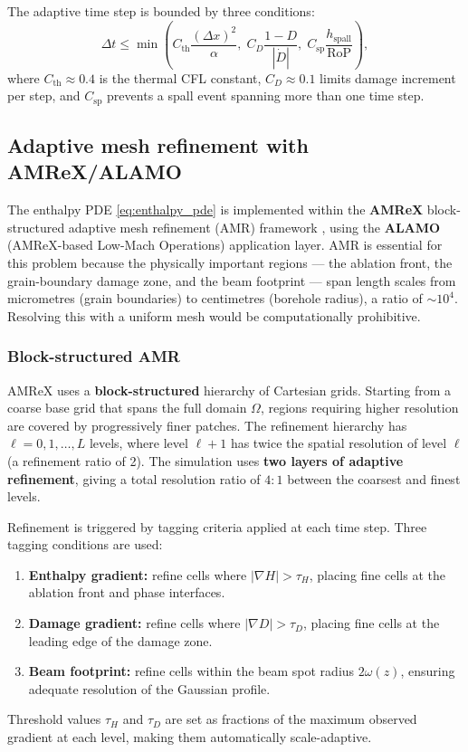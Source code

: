 \documentclass[12pt, a4paper]{article}
\begin{document}
The adaptive time step is bounded by three conditions:
\begin{equation}
    \Delta t \le \min\!\left(
        C_\mathrm{th}\frac{(\Delta x)^2}{\alpha},\;
        C_D\frac{1 - D}{|\dot{D}|},\;
        C_\mathrm{sp}\frac{h_\mathrm{spall}}{\mathrm{RoP}}
    \right),
    \label{eq:cfl}
\end{equation}
where $C_\mathrm{th} \approx 0.4$ is the thermal CFL constant, $C_D \approx 0.1$
limits damage increment per step, and $C_\mathrm{sp}$ prevents a spall event
spanning more than one time step.

\subsection{Adaptive mesh refinement with AMReX/ALAMO}
\label{sec:amr}

The enthalpy PDE \cref{eq:enthalpy_pde} is implemented within the
\textbf{AMReX} block-structured adaptive mesh refinement (AMR) framework
\citep{zhang2019amrex}, using the \textbf{ALAMO} (AMReX-based Low-Mach
Operations) application layer.  AMR is essential for this problem because
the physically important regions — the ablation front, the grain-boundary
damage zone, and the beam footprint — span length scales from micrometres
(grain boundaries) to centimetres (borehole radius), a ratio of $\sim 10^4$.
Resolving this with a uniform mesh would be computationally prohibitive.

\subsubsection{Block-structured AMR}

AMReX uses a \textbf{block-structured} hierarchy of Cartesian grids.
Starting from a coarse base grid that spans the full domain $\Omega$,
regions requiring higher resolution are covered by progressively finer
patches.  The refinement hierarchy has $\ell = 0, 1, \ldots, L$ levels,
where level $\ell+1$ has twice the spatial resolution of level $\ell$ (a
refinement ratio of 2).  The simulation uses \textbf{two layers of
adaptive refinement}, giving a total resolution ratio of $4:1$ between
the coarsest and finest levels.

Refinement is triggered by tagging criteria applied at each time step.
Three tagging conditions are used:
\begin{enumerate}[noitemsep]
    \item \textbf{Enthalpy gradient:} refine cells where
          $|\nabla H| > \tau_H$, placing fine cells at the ablation
          front and phase interfaces.
    \item \textbf{Damage gradient:} refine cells where
          $|\nabla D| > \tau_D$, placing fine cells at the leading edge
          of the damage zone.
    \item \textbf{Beam footprint:} refine cells within the beam spot
          radius $2\omega(z)$, ensuring adequate resolution of the
          Gaussian profile.
\end{enumerate}
Threshold values $\tau_H$ and $\tau_D$ are set as fractions of the maximum
observed gradient at each level, making them automatically scale-adaptive.
\end{document}
